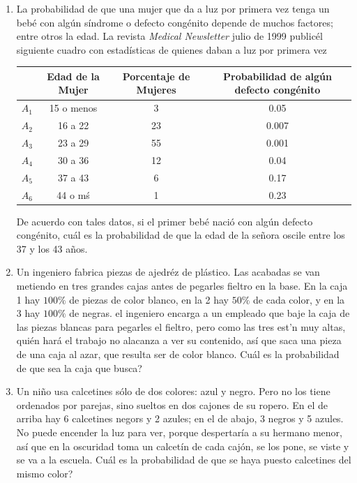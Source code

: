 \begin{Ejer}
\begin{enumerate}
\item La probabilidad de que una mujer que da a luz por primera vez tenga un beb\'e con alg\'un s\'indrome o defecto cong\'enito depende de muchos factores; entre otros la edad.  La revista { \em Medical Newsletter} julio de 1999 public\' el siguiente cuadro con estad\'isticas de quienes daban a luz por primera vez

\begin{table}[!ht]
\begin{center}
\begin{tabular}{|c|c|c|c|}
\hline
 & Edad de la Mujer  & Porcentaje de Mujeres & Probabilidad de alg\'un defecto cong\'enito \\\hline
$A_{1}$ & 15 o menos & 3 & 0.05 \\\hline
$A_{2}$ & 16 a 22 & 23 & 0.007 \\\hline
$A_{3}$ & 23 a 29 & 55 & 0.001 \\\hline
$A_{4}$ & 30 a 36 & 12 & 0.04 \\\hline
$A_{5}$ & 37 a 43 & 6 & 0.17 \\\hline
$A_{6}$ & 44 o m\'s & 1 & 0.23 \\\hline
\end{tabular}
\end{center}
\end{table}

De acuerdo con tales datos, si el primer beb\'e naci\'o con alg\'un defecto cong\'enito, cu\'al es la probabilidad de que la edad de la se\~nora oscile entre los 37 y los 43 a\~nos.

\item Un ingeniero fabrica piezas de ajedr\'ez de pl\'astico. Las acabadas se van metiendo en tres grandes cajas antes de pegarles fieltro en la base. En la caja 1 hay $100\%$ de piezas de color blanco, en la 2 hay $50\%$ de cada color, y en la 3 hay $100\%$ de negras. el ingeniero encarga a un empleado que baje la caja de las piezas blancas para pegarles el fieltro, pero como las tres est\a'n muy altas, qui\'en har\'a el trabajo no alacanza a ver su contenido, as\'i que saca una pieza de una caja al azar, que resulta ser de color blanco. Cu\'al es la probabilidad de que sea la caja que busca?


\item Un ni\~no usa calcetines s\'olo de dos colores: azul y negro. Pero no los tiene ordenados por parejas, sino sueltos en dos cajones de su ropero. En el de arriba hay 6 calcetines negors y 2 azules; en el de abajo, 3 negros y 5 azules. No puede encender la luz para ver, porque despertar\'ia a su hermano menor, as\'i que en la oscuridad toma un calcet\'in de cada caj\'on, se los pone, se viste y se va a la escuela.  Cu\'al es la probabilidad de que se haya puesto calcetines del mismo color?


\end{enumerate}
\end{Ejer}
